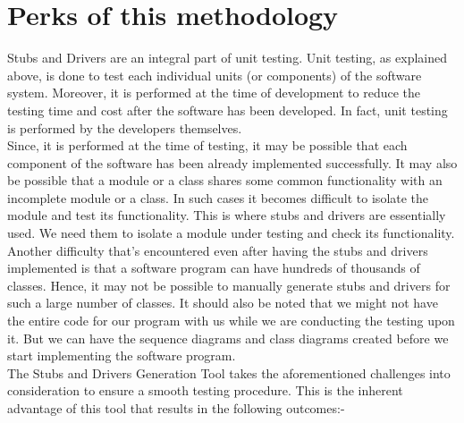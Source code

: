 \documentclass{article}
\begin{document}
\section{Perks of this methodology}
Stubs and Drivers are an integral part of unit testing. Unit testing, as explained above, is done to test each individual units (or components) of the software system. Moreover, it is performed at the time of development to reduce the testing time and cost after the software has been developed. In fact, unit testing is performed by the developers themselves.\\

Since, it is performed at the time of testing, it may be possible that each component of the software has been already implemented successfully. It may also be possible that a module or a class shares some common functionality with an incomplete module or a class. In such cases it becomes difficult to isolate the module and test its functionality. This is where stubs and drivers are essentially used. We need them to isolate a module under testing and check its functionality.\\

Another difficulty that's encountered even after having the stubs and drivers implemented is that a software program can have hundreds of thousands of classes. Hence, it may not be possible to manually generate stubs and drivers for such a large number of classes. It should also be noted that we might not have the entire code for our program with us while we are conducting the testing upon it. But we can have the sequence diagrams and class diagrams created before we start implementing the software program.\\

The Stubs and Drivers Generation Tool takes the aforementioned challenges into consideration to ensure a smooth testing procedure. This is the inherent advantage of this tool that results in the following outcomes:-
\end{document}
